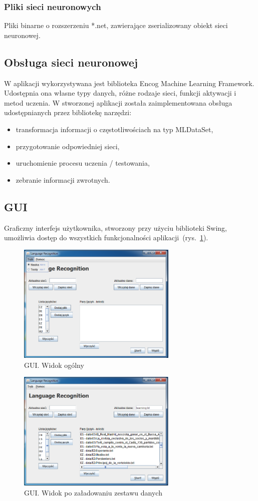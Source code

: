 \documentclass[journal]{IEEEtran}
\begin{document}
\subsubsection{Pliki sieci neuronowych}
Pliki binarne o rozszerzeniu *.net, zawierające zserializowany obiekt sieci neuronowej.

\subsection{Obsługa sieci neuronowej}
W aplikacji wykorzystywana jest biblioteka Encog Machine Learning Framework. Udostępnia ona własne typy danych, różne
rodzaje sieci, funkcji aktywacji i metod uczenia. W stworzonej aplikacji została zaimplementowana obsługa udostępnianych
przez bibliotekę narzędzi:
\begin{itemize}
 \item transformacja informacji o częstotliwościach na typ \mbox{MLDataSet},
 \item przygotowanie odpowiedniej sieci,
 \item uruchomienie procesu uczenia / testowania,
 \item zebranie informacji zwrotnych.
\end{itemize}

\subsection{GUI}
Graficzny interfejs użytkownika, stworzony przy użyciu biblioteki Swing, umożliwia dostęp do wszystkich
funkcjonalności aplikacji~(rys.~\ref{fig:gui}).

\begin{figure}[!t]
\centering
\includegraphics[width=3in]{GUI}
\caption{GUI. Widok ogólny}
\label{fig:gui}
\end{figure}

\begin{figure}[!t]
\centering
\includegraphics[width=3in]{Learning_ON}
\caption{GUI. Widok po załadowaniu zestawu danych}
\label{fig:gui_zestaw}
\end{figure}
\end{document}
